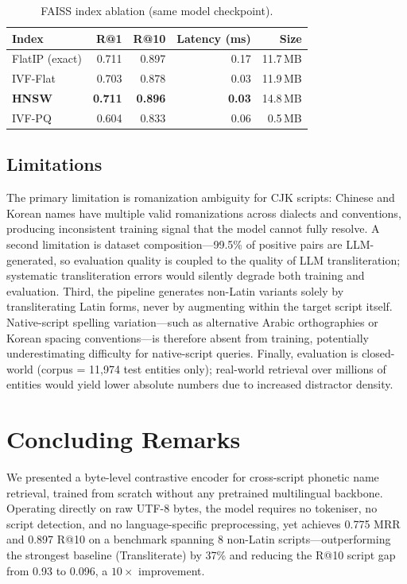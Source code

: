 \documentclass[sigconf]{acmart}
\begin{document}
\begin{table}[h]
\centering
\caption{FAISS index ablation (same model checkpoint).}
\label{tab:faiss}
\begin{tabular}{lrrrr}
\toprule
Index & R@1 & R@10 & Latency (ms) & Size \\
\midrule
FlatIP (exact) & 0.711 & 0.897 & 0.17 & 11.7\,MB \\
IVF-Flat       & 0.703 & 0.878 & 0.03 & 11.9\,MB \\
\textbf{HNSW}  & \textbf{0.711} & \textbf{0.896} & \textbf{0.03} & 14.8\,MB \\
IVF-PQ         & 0.604 & 0.833 & 0.06 & 0.5\,MB \\
\bottomrule
\end{tabular}
\end{table}

\subsection{Limitations}

The primary limitation is romanization ambiguity for CJK scripts: Chinese and Korean names
have multiple valid romanizations across dialects and conventions, producing inconsistent
training signal that the model cannot fully resolve. A second limitation is dataset
composition---99.5\% of positive pairs are LLM-generated, so evaluation quality is coupled
to the quality of LLM transliteration; systematic transliteration errors would silently
degrade both training and evaluation. Third, the pipeline generates non-Latin variants solely by transliterating Latin forms,
never by augmenting within the target script itself. Native-script spelling variation---such
as alternative Arabic orthographies or Korean spacing conventions---is therefore absent
from training, potentially underestimating difficulty for native-script queries. Finally,
evaluation is closed-world (corpus = 11,974 test entities only); real-world retrieval over
millions of entities would yield lower absolute numbers due to increased distractor density.

\section{Concluding Remarks}

We presented a byte-level contrastive encoder for cross-script phonetic name retrieval,
trained from scratch without any pretrained multilingual backbone. Operating directly on
raw UTF-8 bytes, the model requires no tokeniser, no script detection, and no
language-specific preprocessing, yet achieves 0.775 MRR and 0.897 R@10 on a benchmark
spanning 8 non-Latin scripts---outperforming the strongest baseline (Transliterate) by
37\% and reducing the R@10 script gap from 0.93 to 0.096, a $10\times$ improvement.
\end{document}
